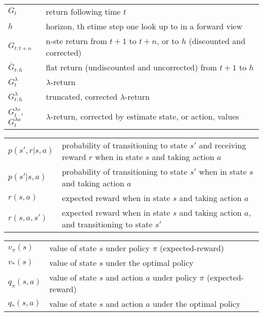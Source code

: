 \documentclass[10pt, landscape, a4paper]{article}
\begin{document}
\begin{multicols}{3}
        \begin{tabular}{ p{} p{} }
            $G_t$                                    & return following time $t$                                              \\
            $h$                                      & horizon, th etime step one look up to in a forward view                \\
            $G_{t:t+n}$                              & n-ste return from $t+1$ to $t+n$, or to $h$ (discounted and corrected) \\
            $\bar{G}_{t:h}$                          & flat return (undiscounted and uncorrected) from $t+1$ to $h$           \\
            $G_{t}^{\lambda}$                        & $\lambda$-return                                                       \\
            $G_{t:h}^{\lambda}$                      & truncated, corrected $\lambda$-return                                  \\
            $G_{t}^{\lambda s}$, $G_{t}^{\lambda a}$ & $\lambda$-return, corrected by estimate state, or action, values       \\
        \end{tabular}

        \begin{tabular}{ p{} p{} }
            $p(s',r|s,a)$ & probability of transitioning to state $s'$ and receiving reward $r$ when in state $s$ and taking action $a$ \\
            $p(s'|s,a)$   & probability of transitioning to state $s'$ when in state $s$ and taking action $a$                          \\
            $r(s,a)$      & expected reward when in state $s$ and taking action $a$                                                     \\
            $r(s,a,s')$   & expected reward when in state $s$ and taking action $a$, and transitioning to state $s'$                    \\
        \end{tabular}

        \begin{tabular}{ p{} p{} }
            $v_{\pi}(s)$   & value of state $s$ under policy $\pi$ (expected-reward)                \\
            $v_{*}(s)$     & value of state $s$ under the optimal policy                            \\
            $q_{\pi}(s,a)$ & value of state $s$ and action $a$ under policy $\pi$ (expected-reward) \\
            $q_{*}(s,a)$   & value of state $s$ and action $a$ under the optimal policy             \\
        \end{tabular}


\end{multicols}
\end{document}
